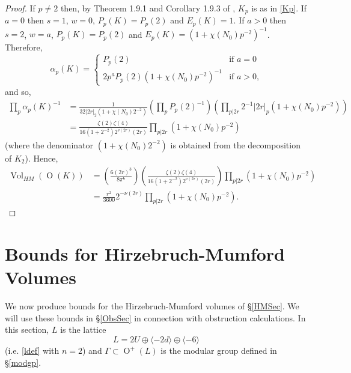 \documentclass[12pt, a4paper]{article}
\newcommand{\la}{\langle}
\newcommand{\ra}{\rangle}
\newcommand{\opn}{\operatorname}
\newcommand{\op}{\oplus}
\begin{document}
\begin{proof}
  If $p \neq 2$ then, by Theorem 1.9.1 and  Corollary 1.9.3 of \cite{Nikulin}, $K_p$ is as in \eqref{Kp}.
  If $a=0$ then $s=1$, $w=0$, $P_p(K) = P_p(2)$ and $E_p(K)=1$.
  If $a>0$ then $s=2$, $w=a$, $P_p(K)=P_p(2)$ and $E_p(K)=(1+\chi(N_0)p^{-2})^{-1}$.
  Therefore,
  \begin{equation*}
    \alpha_p(K) =
    \begin{cases}
      P_p(2) & \text{if $a=0$} \\
      2 p^a P_p(2) (1+\chi(N_0)p^{-2})^{-1} & \text{if $a>0$,}
    \end{cases}
  \end{equation*}
  and so,  
  \begin{align*}
    \prod_p \alpha_p(K)^{-1}
    & = 
    \frac{1}{32 \vert 2r \vert_2 (1 + \chi(N_0)2^{-2})}
    \left ( \prod_p P_p(2)^{-1} \right )
    \left ( \prod_{p \vert 2r} 2^{-1} \vert 2r \vert_p
    (1 + \chi(N_0)p^{-2}) \right ) \\
    & =
    \frac{\zeta(2) \zeta(4)}{16 (1+2^{-2}) 2^{\nu(2r)} (2r)} \prod_{p \vert 2r} (1 + \chi(N_0)p^{-2})
  \end{align*}
  (where the denominator $(1 + \chi(N_0)2^{-2})$ is obtained from the decomposition of $K_2$).
  Hence, 
  \begin{align*}
    \opn{Vol}_{HM}(\opn{O}(K))
    & = \left ( \frac{6(2r)^3}{8 \pi^6} \right ) \left ( \frac{\zeta(2) \zeta(4)}{16 (1+2^{-2}) 2^{\nu(2r)} (2r)} \right ) \prod_{p \vert 2r} (1 + \chi(N_0)p^{-2}) \\
    & = \frac{r^2}{3600}2^{-\nu(2r)} \prod_{p \vert 2r} (1 + \chi(N_0)p^{-2}).
  \end{align*}     
\end{proof}
 \section{Bounds for Hirzebruch-Mumford Volumes}\label{hmbounds}
We now produce bounds for the Hirzebruch-Mumford volumes of \S\ref{HMSec}.
We will use these bounds in \S\ref{ObsSec} in connection with obstruction calculations.
In this section, $L$ is the lattice
\[
L=2U \op \la -2d \ra \op \la -6 \ra
\] 
(i.e. \eqref{ldef} with $n=2$) and $\Gamma \subset \opn{O}^+(L)$ is the modular group defined in \S\ref{modgp}.
\end{document}
